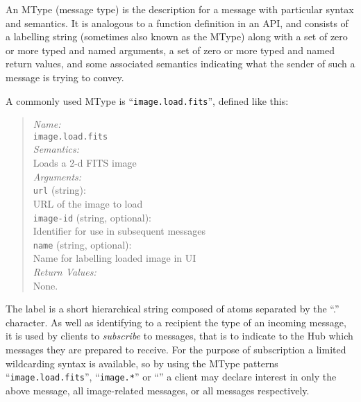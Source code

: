 \documentclass[5p]{elsarticle}
\begin{document}
An MType (message type) is the description for a message with particular
syntax and semantics.
It is analogous to a function definition in an API,
and consists of a labelling string (sometimes also known as the MType)
along with
a set of zero or more typed and named arguments,
a set of zero or more typed and named return values,
and some associated semantics indicating what the sender of such a
message is trying to convey.

A commonly used MType is ``{\tt image.load.fits}'',
defined like this:
\begin{quote}
  {\em Name:\/} \\
    \hspace*{1em} {\tt image.load.fits} \\
  {\em Semantics:\/} \\
    \hspace*{1em} Loads a 2-d FITS image \\
  {\em Arguments:\/} \\
    \hspace*{1em} {\tt url} (string): \\
    \hspace*{2em} URL of the image to load \\
    \hspace*{1em} {\tt image-id} (string, optional): \\
    \hspace*{2em} Identifier for use in subsequent messages \\
    \hspace*{1em} {\tt name} (string, optional): \\
    \hspace*{2em} Name for labelling loaded image in UI \\
  {\em Return Values:\/} \\
    \hspace*{1em} None.
\end{quote}

The label is a short hierarchical string composed of atoms separated
by the ``.'' character.
As well as identifying to a recipient the type of an incoming message,
it is used by clients to {\em subscribe\/} to messages, that is to
indicate to the Hub which messages they are prepared to receive.
For the purpose of subscription a limited wildcarding syntax is available,
so by using the MType patterns
``{\tt image.load.fits}'', ``{\tt image.*}'' or ``{\tt *}''
a client may declare interest in only the above message,
all image-related messages, or all messages respectively.
\end{document}
